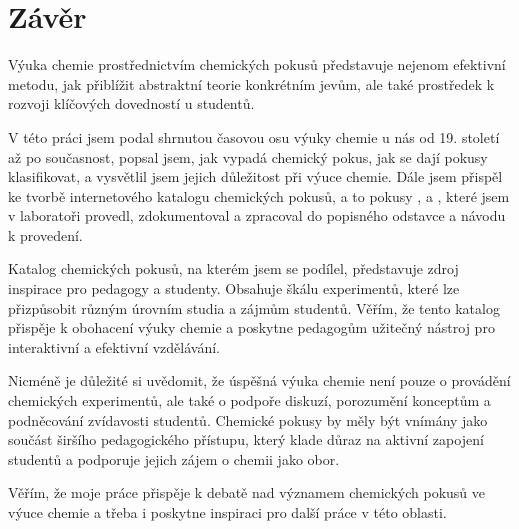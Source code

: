 \newpage
\chapter*{Závěr}

Výuka chemie prostřednictvím chemických pokusů představuje nejenom efektivní metodu, jak přiblížit abstraktní teorie konkrétním jevům, ale také prostředek k rozvoji klíčových dovedností u studentů.

V této práci jsem podal shrnutou časovou osu výuky chemie u nás od 19. století až po současnost, popsal jsem, jak vypadá chemický pokus, jak se dají pokusy klasifikovat, a vysvětlil jsem jejich důležitost při výuce chemie. Dále jsem přispěl ke tvorbě internetového katalogu chemických pokusů, a to pokusy ,  a , které jsem v laboratoři provedl, zdokumentoval a zpracoval do popisného odstavce a návodu k provedení.  

Katalog chemických pokusů, na kterém jsem se podílel, představuje zdroj inspirace pro pedagogy a studenty. Obsahuje škálu experimentů, které lze přizpůsobit různým úrovním studia a zájmům studentů. Věřím, že tento katalog přispěje k obohacení výuky chemie a poskytne pedagogům užitečný nástroj pro interaktivní a efektivní vzdělávání.

Nicméně je důležité si uvědomit, že úspěšná výuka chemie není pouze o provádění chemických experimentů, ale také o podpoře diskuzí, porozumění konceptům a podněcování zvídavosti studentů. Chemické pokusy by měly být vnímány jako součást širšího pedagogického přístupu, který klade důraz na aktivní zapojení studentů a podporuje jejich zájem o chemii jako obor.

Věřím, že moje práce přispěje k debatě nad významem chemických pokusů ve výuce chemie a třeba i poskytne inspiraci pro další práce v této oblasti.
